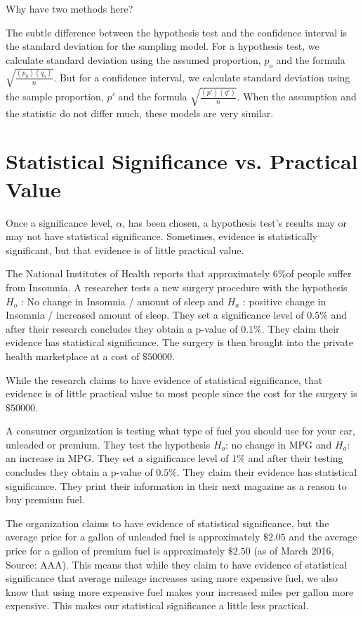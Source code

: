 Why have two methods here? 

The subtle difference between the hypothesis test and the confidence interval is the standard deviation for the sampling model. For a hypothesis test, we calculate standard deviation using the assumed proportion, \(p_{o}\) and the formula \(\sqrt{\frac{(p_{0})(q_{o})}{n}}\). But for a confidence interval, we calculate standard deviation using the sample proportion, \(p'\) and the formula \(\sqrt{\frac{(p')(q')}{n}}\). When the assumption and the statistic do not differ much, these models are very similar.



\section[Significance vs.~Value]{Statistical Significance vs. Practical Value}

Once a significance level, \(\alpha\), has been chosen, a hypothesis test's results may or may not have statistical significance. Sometimes, evidence is statistically significant, but that evidence is of little practical value.

\begin{example}
The National Institutes of Health reports that approximately  \(6\%\)of people suffer from Insomnia. A researcher tests a new surgery procedure with the hypothesis \(H_{o}\) : No change in Insomnia / amount of sleep and \(H_{a}\) : positive change in Insomnia / increased amount of sleep. They set a significance level of  \(0.5\%\) and after their research concludes they obtain a p-value of  \(0.1\%\). They claim their evidence has statistical significance. The surgery is then brought into the private health marketplace at a cost of  \(\$50000\).

While the research claims to have evidence of statistical significance, that evidence is of little practical value to most people since the cost for the surgery is \(\$50000\).
\end{example}

\begin{example}
A consumer organization is testing what type of fuel you should use for your car, unleaded or premium. They test the hypothesis \(H_{o}\): no change in MPG and \(H_{a}\): an increase in MPG. They set a significance level of  \(1\%\) and after their testing concludes they obtain a p-value of  \(0.5\%\). They claim their evidence has statistical significance. They print their information in their next magazine as a reason to buy premium fuel. 

The organization claims to have evidence of statistical significance, but the average price for a gallon of unleaded fuel is approximately  \(\$2.05\) and the average price for a gallon of premium fuel is approximately  \(\$2.50\) (as of March 2016, Source: AAA). This means that while they claim to have evidence of statistical significance that average mileage increases using more expensive fuel, we also know that using more expensive fuel makes your increased miles per gallon more expensive. This makes our statistical significance a little less practical.
\end{example}

